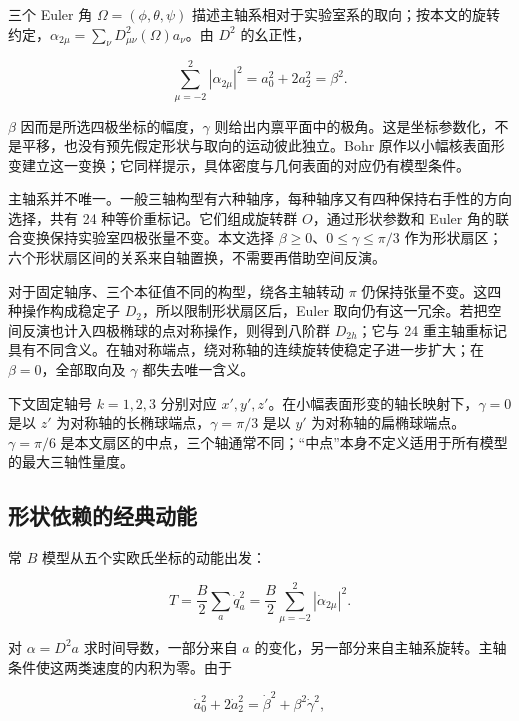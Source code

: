 三个 Euler 角 $\Omega=(\phi,\theta,\psi)$ 描述主轴系相对于实验室系的取向；按本文的旋转约定，$\alpha_{2\mu}=\sum_\nu D^2_{\mu\nu}(\Omega)a_\nu$。由 $D^2$ 的幺正性，

\begin{equation}\label{eq:2-4-4}
\sum_{\mu=-2}^{2}|\alpha_{2\mu}|^2=a_0^2+2a_2^2=\beta^2.
\end{equation}

$\beta$ 因而是所选四极坐标的幅度，$\gamma$ 则给出内禀平面中的极角。这是坐标参数化，不是平移，也没有预先假定形状与取向的运动彼此独立。Bohr 原作以小幅核表面形变建立这一变换；它同样提示，具体密度与几何表面的对应仍有模型条件\cite{bohr-1952-surface-particle-coupling}。

主轴系并不唯一。一般三轴构型有六种轴序，每种轴序又有四种保持右手性的方向选择，共有 24 种等价重标记。它们组成旋转群 $O$，通过形状参数和 Euler 角的联合变换保持实验室四极张量不变。本文选择 $\beta\ge0$、$0\le\gamma\le\pi/3$ 作为形状扇区；六个形状扇区间的关系来自轴置换，不需要再借助空间反演。

对于固定轴序、三个本征值不同的构型，绕各主轴转动 $\pi$ 仍保持张量不变。这四种操作构成稳定子 $D_2$，所以限制形状扇区后，Euler 取向仍有这一冗余。若把空间反演也计入四极椭球的点对称操作，则得到八阶群 $D_{2h}$；它与 24 重主轴重标记具有不同含义。在轴对称端点，绕对称轴的连续旋转使稳定子进一步扩大；在 $\beta=0$，全部取向及 $\gamma$ 都失去唯一含义\cite{bohr-1952-surface-particle-coupling, prochniak-rohozinski-2009-bohr-collective-hamiltonian}。

下文固定轴号 $k=1,2,3$ 分别对应 $x',y',z'$。在小幅表面形变的轴长映射下，$\gamma=0$ 是以 $z'$ 为对称轴的长椭球端点，$\gamma=\pi/3$ 是以 $y'$ 为对称轴的扁椭球端点。$\gamma=\pi/6$ 是本文扇区的中点，三个轴通常不同；“中点”本身不定义适用于所有模型的最大三轴性量度。


\subsection{形状依赖的经典动能}\label{sec:2-4-2}


常 $B$ 模型从五个实欧氏坐标的动能出发：

\begin{equation}\label{eq:2-4-5}
T=\frac{B}{2}\sum_a\dot q_a^2
=\frac{B}{2}\sum_{\mu=-2}^{2}|\dot\alpha_{2\mu}|^2.
\end{equation}

对 $\alpha=D^2a$ 求时间导数，一部分来自 $a$ 的变化，另一部分来自主轴系旋转。主轴条件使这两类速度的内积为零。由于

\begin{equation}\label{eq:2-4-6}
\dot a_0^2+2\dot a_2^2=\dot\beta^2+\beta^2\dot\gamma^2,
\end{equation}

